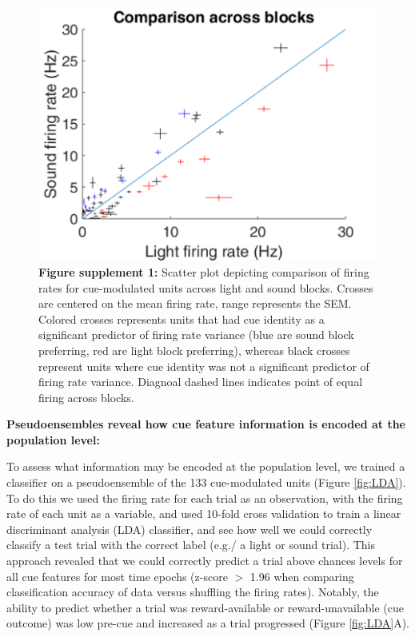 \documentclass[11pt]{article}
\newcommand{\bsf}[1]{\textbf{#1}}
\begin{document}
 \begin{figure}[ht!]
\centering
\includegraphics[height=0.3\textheight]{Fig 6 - SUPP scatter.pdf}
\caption*{\bsf{Figure supplement 1:} Scatter plot depicting comparison of firing rates for cue-modulated units across light and sound blocks. Crosses are centered on the mean firing rate, range represents the SEM. Colored crosses represents units that had cue identity as a significant predictor of firing rate variance (blue are sound block preferring, red are light block preferring), whereas black crosses represent units where cue identity was not a significant predictor of firing rate variance. Diagnoal dashed lines indicates point of equal firing across blocks.}
\label{fig:scat}
\end{figure} \clearpage

{\bf Pseudoensembles reveal how cue feature information is encoded at the population level:}

To assess what information may be encoded at the population level, we trained a classifier on a pseudoensemble of the 133 cue-modulated units (Figure \ref{fig:LDA}). To do this we used the firing rate for each trial as an observation, with the firing rate of each unit as a variable, and used 10-fold cross validation to train a linear discriminant analysis (LDA) classifier, and see how well we could correctly classify a test trial with the correct label (e.g./ a light or sound trial). This approach revealed that we could correctly predict a trial above chances levels for all cue features for most time epochs (z-score $>$ 1.96 when comparing classification accuracy of data versus shuffling the firing rates). Notably, the ability to predict whether a trial was reward-available or reward-unavailable (cue outcome) was low pre-cue and increased as a trial progressed (Figure \ref{fig:LDA}A). 
\end{document}
